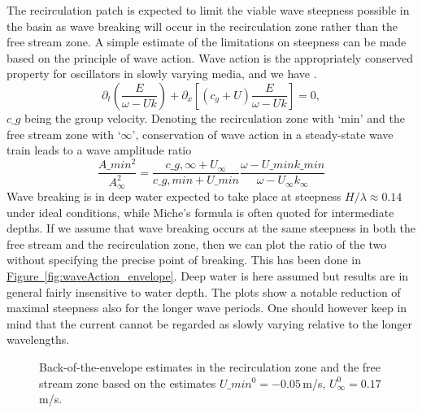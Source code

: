The recirculation patch is expected to limit the viable wave steepness possible in the basin as wave breaking will occur in the recirculation zone rather than the free stream zone. 
A simple estimate of the limitations on steepness can be made based on the principle of wave action. 
Wave action is the appropriately conserved property for oscillators in slowly varying media, and we have \citep[]{mei_2005}.
\[\partial_t \left( \frac{E}{\omega-U k}\right) + \partial_x\left[(c_g+U)\frac{E}{\omega-U k}\right]=0,\]
$c\_g$ being the group velocity.
Denoting the recirculation zone with `min' and the free stream zone with `$\infty$', conservation of wave action in a steady-state wave train leads to a wave amplitude ratio
\begin{equation}
\frac{A\_{min}^2}{A_\infty^2}=\frac{c\_{g,\infty}+U_\infty}{c\_{g,min}+U\_{min}}\frac{\omega-U\_{min}k\_{min}}{\omega-U_\infty k_\infty}
\label{eq:}
\end{equation}
Wave breaking is in deep water expected to take place at steepness $H/\lambda\approx0.14$ under ideal conditions, while Miche's formula is often quoted for intermediate depths.
If we assume that wave breaking occurs at the same steepness in both the free stream and the recirculation zone, then we can plot the ratio of the two without specifying the precise point of breaking.
This has been done in 
\href{fig:waveAction_envelope}{Figure~\ref*{fig:waveAction_envelope}}. Deep water is here assumed but results are in general fairly insensitive to water depth.
The plots show a notable reduction of maximal steepness also for the longer wave periods. 
One should however keep in mind that the current cannot be regarded as slowly varying relative to the longer wavelengths.


\begin{figure}[h!ptb]%
\centering
{}%
\qquad
{}%
\caption{Back-of-the-envelope estimates in the recirculation zone and the free stream zone based on the estimates $U\_{min}^0 = -0.05$\,m/s, $U_\infty^0=0.17$\,m/s.}%
\label{fig:envelope}%
\end{figure}
%
%
%
